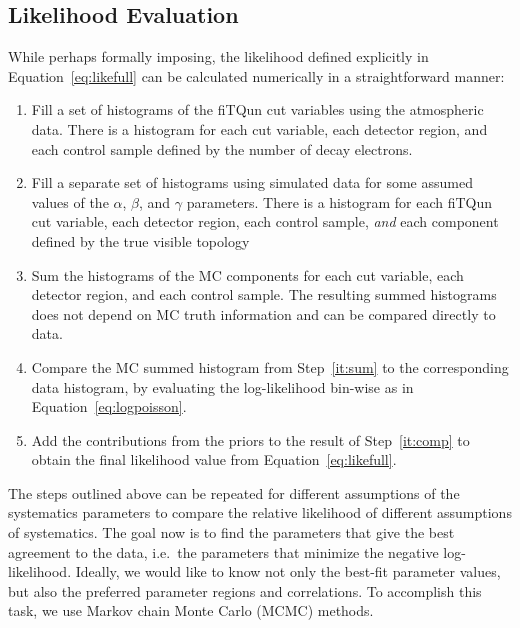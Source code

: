 \subsection{Likelihood Evaluation}
\label{subsec:evalike}

While perhaps formally imposing, the likelihood defined explicitly in
Equation~\ref{eq:likefull} can be calculated numerically in a straightforward
manner:

\begin{enumerate}
  \item \label{it:first} Fill a set of histograms of the fiTQun cut variables using the atmospheric data.
    There is a histogram for each cut variable, each detector region,
    and each control sample defined by the number of decay electrons.
  \item
    Fill a separate set of histograms using simulated data for some assumed
    values of the $\alpha$, $\beta$, and $\gamma$ parameters. There is a
    histogram for each fiTQun cut variable, each detector region, each control
    sample, \emph{and} each component defined by the true visible topology
  \item \label{it:sum} Sum the histograms of the MC components for each cut
    variable, each detector region, and each control sample. The resulting summed histograms
    does not depend on MC truth information and can be compared directly to data.
  \item
    \label{it:comp} Compare the MC summed histogram from Step~\ref{it:sum} to
    the corresponding data histogram, by evaluating the log-likelihood bin-wise
    as in Equation~\ref{eq:logpoisson}. 
  \item Add the contributions from the
    priors to the result of Step~\ref{it:comp} to obtain the final likelihood
    value from Equation~\ref{eq:likefull}.
\end{enumerate}

The steps outlined above can be repeated for different assumptions of the
systematics parameters to compare the relative likelihood of different
assumptions of systematics.  The goal now is to find the parameters that give
the best agreement to the data, i.e.\ the parameters that minimize the negative
log-likelihood.  Ideally, we would like to know not only the best-fit parameter
values, but also the preferred parameter regions and correlations.  To
accomplish this task, we use Markov chain Monte Carlo (MCMC) methods.



